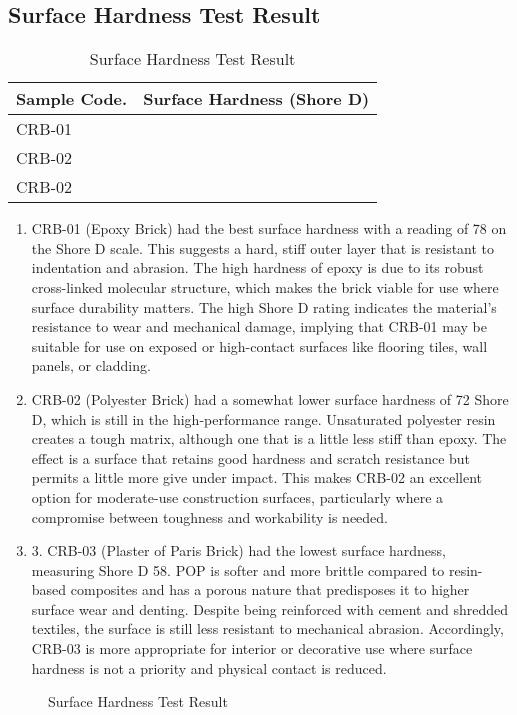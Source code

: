 \subsection{Surface Hardness Test Result}
\begin{table}[h!]
	\renewcommand{\arraystretch}{2} %
	\setlength{\tabcolsep}{20pt} %
	\begin{tabular}{
		|>{\centering\arraybackslash}m{6cm}|
		>{\centering\arraybackslash}m{6cm}|
		}
		\hline
		\rowcolor{gray!20}
		Sample Code. & Surface Hardness (Shore D) \\ \hline
		CRB-01       & 78                         \\  \hline
		CRB-02       & 72                         \\  \hline
		CRB-02       & 58                         \\  \hline
	\end{tabular}
	\caption{Surface Hardness Test Result}
	\label{tab:placeholder}
\end{table}
\begin{enumerate}
	\item CRB-01 (Epoxy Brick) had the best surface hardness with a reading of 78 on the Shore D scale. This suggests a hard, stiff outer layer that is resistant to indentation and abrasion. The high hardness of epoxy is due to its robust cross-linked molecular structure, which makes the brick viable for use where surface durability matters. The high Shore D rating indicates the material's resistance to wear and mechanical damage, implying that CRB-01 may be suitable for use on exposed or high-contact surfaces like flooring tiles, wall panels, or cladding.
	\item CRB-02 (Polyester Brick) had a somewhat lower surface hardness of 72 Shore D, which is still in the high-performance range. Unsaturated polyester resin creates a tough matrix, although one that is a little less stiff than epoxy. The effect is a surface that retains good hardness and scratch resistance but permits a little more give under impact. This makes CRB-02 an excellent option for moderate-use construction surfaces, particularly where a compromise between toughness and workability is needed.
	\item 3. CRB-03 (Plaster of Paris Brick) had the lowest surface hardness, measuring Shore D 58. POP is softer and more brittle compared to resin-based composites and has a porous nature that predisposes it to higher surface wear and denting. Despite being reinforced with cement and shredded textiles, the surface is still less resistant to mechanical abrasion. Accordingly, CRB-03 is more appropriate for interior or decorative use where surface hardness is not a priority and physical contact is reduced.
\end{enumerate}
\begin{figure}[H]
	\begin{minipage}{1\textwidth}
		\centering
		\caption{Surface Hardness Test Result}
	\end{minipage}
\end{figure}

